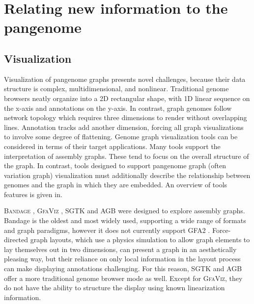 \section{Relating new information to the pangenome}

\subsection{Visualization}


Visualization of pangenome graphs presents novel challenges, because their data structure is complex, multidimensional, and nonlinear.
Traditional genome browsers neatly organize into a 2D rectangular shape, with 1D linear sequence on the x-axis and annotations on the y-axis.
In contrast, graph genomes follow network topology which requires three dimensions to render without overlapping lines.
Annotation tracks add another dimension, forcing all graph visualizations to involve some degree of flattening.  
Genome graph visualization tools can be considered in terms of their target applications. 
Many tools support the interpretation of assembly graphs. 
These tend to focus on the overall structure of the graph. 
In contrast, tools designed to support pangenome graph (often variation graph) visualization must additionally describe the relationship between genomes and the graph in which they are embedded.
An overview of tools features is given in.

\textsc{Bandage} \cite{Wick_2015}, \textsc{GfaViz} \cite{Gonnella_2018}, \textsc{SGTK} \cite{Kunyavskaya_2018} and \textsc{AGB} \cite{Mikheenko_2019} were designed to explore assembly graphs.
Bandage is the oldest and most widely used, supporting a wide range of formats and graph  paradigms, however it does not currently support GFA2 \citep{Mikheenko_2019}.
Force-directed graph layouts, which use a physics simulation to allow graph elements to lay themselves out in two dimensions, can present a graph in an aesthetically pleasing way, but their reliance on only local information in the layout process can make displaying annotations challenging.
For this reason, \textsc{SGTK} and \textsc{AGB} offer a more traditional genome browser mode as well.
Except for \textsc{GfaViz}, they do not have the ability to structure the display using known linearization information. 

